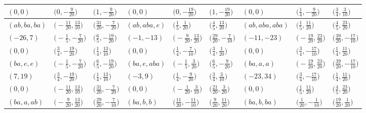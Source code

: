 \documentclass[10pt,a4paper]{amsart}
\theoremstyle{definition}
\numberwithin{equation}{section}
\begin{document}
\begin{landscape}
\begin{table}[th]
\begin{tabular}{|lll|lll|lll|}
\\
$(0, 0)$ & $\bigl(0, -\frac{9}{20}\bigr)$ & $\bigl(1, -\frac{9}{20}\bigr)$ & $(0, 0)$ & $\bigl(0, -\frac{19}{20}\bigr)$ & $\bigl(1, -\frac{19}{20}\bigr)$ & $(0, 0)$ & $\bigl(\frac{1}{4}, -\frac{9}{20}\bigr)$ & $\bigl(\frac{3}{4}, \frac{3}{10}\bigr)$
\\\hline
$(ab, ba, ba)$ & $\bigl(-\frac{11}{20}, \frac{13}{10}\bigr)$ & $\bigl(\frac{31}{20}, -\frac{7}{20}\bigr)$ & $(ab, aba, e)$ & $\bigl(\frac{1}{5}, \frac{1}{20}\bigr)$ & $\bigl(\frac{4}{5}, \frac{13}{20}\bigr)$ & $(ab, aba, aba)$ & $\bigl(\frac{1}{5}, \frac{11}{20}\bigr)$ & $\bigl(\frac{4}{5}, \frac{23}{20}\bigr)$
\\
$(-26, 7)$ & $\bigl(-\frac{1}{5}, -\frac{7}{20}\bigr)$ & $\bigl(\frac{6}{5}, -\frac{19}{20}\bigr)$ & $(-1, -13)$ & $\bigl(-\frac{9}{20}, \frac{13}{20}\bigr)$ & $\bigl(\frac{29}{20}, -\frac{7}{10}\bigr)$ & $(-11, -23)$ & $\bigl(-\frac{19}{20}, \frac{23}{20}\bigr)$ & $\bigl(\frac{39}{20}, -\frac{17}{10}\bigr)$
\\
$(0, 0)$ & $\bigl(\frac{3}{4}, -\frac{19}{20}\bigr)$ & $\bigl(\frac{1}{4}, \frac{13}{10}\bigr)$ & $(0, 0)$ & $\bigl(\frac{1}{4}, -\frac{7}{10}\bigr)$ & $\bigl(\frac{3}{4}, \frac{1}{20}\bigr)$ & $(0, 0)$ & $\bigl(\frac{3}{4}, -\frac{17}{10}\bigr)$ & $\bigl(\frac{1}{4}, \frac{11}{20}\bigr)$
\\\hline
$(ba, e, e)$ & $\bigl(-\frac{1}{5}, -\frac{7}{20}\bigr)$ & $\bigl(\frac{6}{5}, -\frac{19}{20}\bigr)$ & $(ba, e, aba)$ & $\bigl(-\frac{1}{5}, \frac{3}{20}\bigr)$ & $\bigl(\frac{6}{5}, -\frac{9}{20}\bigr)$ & $(ba, a, a)$ & $\bigl(-\frac{19}{20}, \frac{23}{20}\bigr)$ & $\bigl(\frac{39}{20}, -\frac{17}{10}\bigr)$
\\
$(7, 19)$ & $\bigl(\frac{3}{4}, -\frac{19}{20}\bigr)$ & $\bigl(\frac{1}{4}, \frac{13}{10}\bigr)$ & $(-3, 9)$ & $\bigl(\frac{1}{4}, -\frac{9}{20}\bigr)$ & $\bigl(\frac{3}{4}, \frac{3}{10}\bigr)$ & $(-23, 34)$ & $\bigl(\frac{3}{4}, -\frac{17}{10}\bigr)$ & $\bigl(\frac{1}{4}, \frac{11}{20}\bigr)$
\\
$(0, 0)$ & $\bigl(-\frac{11}{20}, \frac{13}{10}\bigr)$ & $\bigl(\frac{31}{20}, -\frac{7}{20}\bigr)$ & $(0, 0)$ & $\bigl(-\frac{1}{20}, \frac{3}{10}\bigr)$ & $\bigl(\frac{21}{20}, \frac{3}{20}\bigr)$ & $(0, 0)$ & $\bigl(\frac{1}{5}, \frac{11}{20}\bigr)$ & $\bigl(\frac{4}{5}, \frac{23}{20}\bigr)$
\\\hline
$(ba, a, ab)$ & $\bigl(-\frac{9}{20}, \frac{13}{20}\bigr)$ & $\bigl(\frac{29}{20}, -\frac{7}{10}\bigr)$ & $(ba, b, b)$ & $\bigl(\frac{11}{20}, -\frac{11}{10}\bigr)$ & $\bigl(\frac{9}{20}, \frac{11}{20}\bigr)$ & $(ba, b, ba)$ & $\bigl(\frac{1}{20}, -\frac{1}{10}\bigr)$ & $\bigl(\frac{19}{20}, \frac{1}{20}\bigr)$

\end{tabular}
\end{table}
\end{landscape}
\end{document}
